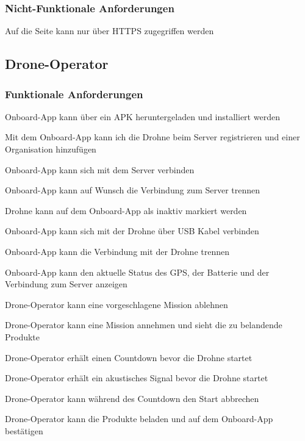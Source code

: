 \subsubsection{Nicht-Funktionale Anforderungen}
\begin{todolist}
	\item[\done] Auf die Seite kann nur über HTTPS zugegriffen werden
\end{todolist}


\subsection{Drone-Operator}
\subsubsection{Funktionale Anforderungen}
\begin{todolist}
	\item[\done] Onboard-App kann über ein APK heruntergeladen und installiert werden
	\item[\done] Mit dem Onboard-App kann ich die Drohne beim Server registrieren und einer Organisation hinzufügen
	\item[\done] Onboard-App kann sich mit dem Server verbinden
	\item[\done] Onboard-App kann auf Wunsch die Verbindung zum Server trennen
	\item[\done] Drohne kann auf dem Onboard-App als inaktiv markiert werden
	\item[\done] Onboard-App kann sich mit der Drohne über USB Kabel verbinden
	\item[\done] Onboard-App kann die Verbindung mit der Drohne trennen
	\item[\done] Onboard-App kann den aktuelle Status des GPS, der Batterie und der Verbindung zum Server anzeigen
	\item[\done] Drone-Operator kann eine vorgeschlagene Mission ablehnen
	\item[\done] Drone-Operator kann eine Mission annehmen und sieht die zu belandende Produkte
	\item[\done] Drone-Operator erhält einen Countdown bevor die Drohne startet
	\item[\done] Drone-Operator erhält ein akustisches Signal bevor die Drohne startet
	\item[\done] Drone-Operator kann während des Countdown den Start abbrechen
	\item[\done] Drone-Operator kann die Produkte beladen und auf dem Onboard-App bestätigen
\end{todolist}

